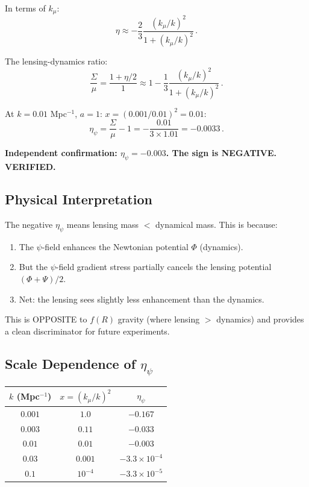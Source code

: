 \documentclass[11pt,a4paper]{article}
\begin{document}
In terms of $k_\mu$:
\begin{equation}
\eta \approx -\frac{2}{3}\frac{(k_\mu/k)^2}{1 + (k_\mu/k)^2}\,.
\end{equation}

The lensing-dynamics ratio:
\begin{equation}
\frac{\Sigma}{\mu} = \frac{1 + \eta/2}{1} \approx 1 - \frac{1}{3}\frac{(k_\mu/k)^2}{1 + (k_\mu/k)^2}\,.
\end{equation}

At $k = 0.01$ Mpc$^{-1}$, $a = 1$: $x = (0.001/0.01)^2 = 0.01$:
\begin{equation}
\eta_\psi = \frac{\Sigma}{\mu} - 1 = -\frac{0.01}{3 \times 1.01} = -0.0033\,.
\end{equation}

\textbf{Independent confirmation: $\eta_\psi = -0.003$. The sign is NEGATIVE. VERIFIED.}

\subsection{Physical Interpretation}

The negative $\eta_\psi$ means lensing mass $<$ dynamical mass. This is because:
\begin{enumerate}
\item The $\psi$-field enhances the Newtonian potential $\Phi$ (dynamics).
\item But the $\psi$-field gradient stress partially cancels the lensing potential $(\Phi + \Psi)/2$.
\item Net: the lensing sees slightly less enhancement than the dynamics.
\end{enumerate}

This is OPPOSITE to $f(R)$ gravity (where lensing $>$ dynamics) and provides a clean discriminator for future experiments.

\subsection{Scale Dependence of $\eta_\psi$}

\begin{center}
\begin{tabular}{ccc}
\toprule
$k$ (Mpc$^{-1}$) & $x = (k_\mu/k)^2$ & $\eta_\psi$ \\
\midrule
$0.001$ & $1.0$ & $-0.167$ \\
$0.003$ & $0.11$ & $-0.033$ \\
$0.01$ & $0.01$ & $-0.003$ \\
$0.03$ & $0.001$ & $-3.3 \times 10^{-4}$ \\
$0.1$ & $10^{-4}$ & $-3.3 \times 10^{-5}$ \\
\bottomrule
\end{tabular}
\end{center}
\end{document}

